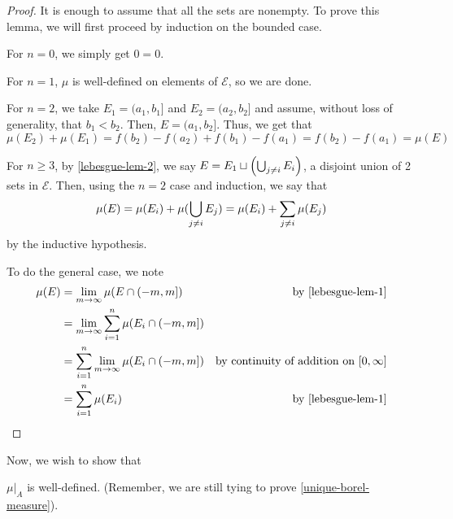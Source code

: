 \documentclass[11pt,leqno,oneside]{amsbook}
\numberwithin{thm}{section}
\newcommand{\Ep}{\mathcal{E}}
\begin{document}
\begin{proof}
  It is enough to assume that all the sets are nonempty. To prove this
  lemma, we will first proceed by induction on the bounded case.

  For $n=0$, we simply get $0=0$.

  For $n=1$, $\mu$ is well-defined on elements of $\Ep$, so we are
  done.

  For $n=2$, we take $E_1 = (a_1,b_1]$ and $E_2 = (a_2,b_2]$ and
  assume, without loss of generality, that $b_1 < b_2$. Then, $E =
  (a_1,b_2]$. Thus, we get that \[
    \mu(E_2) + \mu(E_1) = f(b_2) - f(a_2) + f(b_1) - f(a_1) =
    f(b_2)-f(a_1) = \mu(E)
  \]

  For $n \geq 3$, by \ref{lebesgue-lem-2}, we say $E = E_1 \sqcup
  \left( \bigcup_{j \neq i} E_i \right)$, a disjoint union of 2 sets in
  $\Ep$. Then, using the $n=2$ case and induction, we say that \[
    \mu(E) = \mu(E_i) + \mu(\bigcup_{j \neq i} E_j) = \mu(E_i) +
    \sum_{j \neq i} \mu(E_j)
  \]
  by the inductive hypothesis.

  To do the general case, we note
  \begin{align*}
    \mu(E) & = \lim_{m \to \infty} \mu(E \cap (-m,m]) & \text{
                                                              by
                                                              \ref{lebesgue-lem-1}}
    \\
           & = \lim_{m \to \infty} \sum_{i=1}^n \mu(E_i \cap (-m,m]) \\
    & = \sum_{i=1}^n \lim_{m \to \infty} \mu(E_i \cap (-m,m]) &
                                                                      \text{by
                                                                      continuity
                                                                      of
                                                                      addition
                                                                      on
                                                                       }[0,\infty]
    \\
    & = \sum_{i=1}^n \mu(E_i) & \text{ by \ref{lebesgue-lem-1}}
  \end{align*}
\end{proof}
Now, we wish to show that
\begin{prop}
$\mu|_A$ is well-defined. (Remember, we are
still tying to prove \ref{unique-borel-measure}).
\end{prop}
\end{document}
